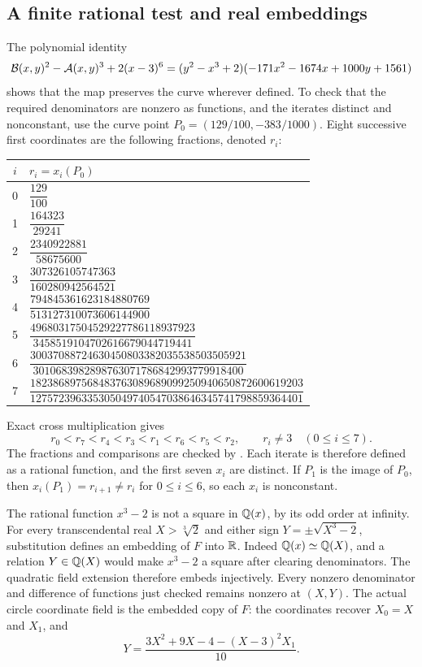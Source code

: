 \subsection{A finite rational test and real embeddings}
The polynomial identity
\begin{equation}\label{eq:curve-identity}
 \mathcal B(x,y)^2-\mathcal A(x,y)^3+2(x-3)^6
 =(y^2-x^3+2)(-171x^2-1674x+1000y+1561)
\end{equation}
shows that the map preserves the curve wherever defined. To check
that the required denominators are nonzero as functions, and the
iterates distinct and nonconstant, use the curve point
$P_0=(129/100,-383/1000)$. Eight successive first coordinates are
the following fractions, denoted $r_i$:
\begin{center}
\small
\begin{tabular}{@{}cl@{}}
\toprule
$i$&$r_i=x_i(P_0)$\\
\midrule
0&$\dfrac{129}{100}$\\[3pt]
1&$\dfrac{164323}{29241}$\\[3pt]
2&$\dfrac{2340922881}{58675600}$\\[3pt]
3&$\dfrac{307326105747363}{160280942564521}$\\[3pt]
4&$\dfrac{794845361623184880769}{513127310073606144900}$\\[3pt]
5&$\dfrac{49680317504529227786118937923}{3458519104702616679044719441}$\\[3pt]
6&$\dfrac{30037088724630450803382035538503505921}{3010683982898763071786842993779918400}$\\[3pt]
7&$\dfrac{182386897568483763089689099250940650872600619203}{127572396335305049740547038646345741798859364401}$\\[3pt]
\bottomrule
\end{tabular}
\end{center}
Exact cross multiplication gives
\begin{equation}\label{eq:orbit-order}
 r_0<r_7<r_4<r_3<r_1<r_6<r_5<r_2,
 \qquad r_i\ne3\quad(0\le i\le7).
\end{equation}
The fractions and comparisons are checked by
. Each iterate is therefore defined as a
rational function, and the first seven $x_i$ are distinct. If
$P_1$ is the image of $P_0$, then $x_i(P_1)=r_{i+1}\ne r_i$
for $0\le i\le6$, so each $x_i$ is nonconstant.

The rational function $x^3-2$ is not a square in $\mathbb Q(x)$, by its
odd order at infinity. For every transcendental real
$X>\sqrt[3]{2}$ and either sign $Y=\pm\sqrt{X^3-2}$, substitution
defines an embedding of $F$ into $\mathbb R$. Indeed $\mathbb Q(x)\simeq\mathbb Q(X)$,
and a relation $Y\in\mathbb Q(X)$ would make $x^3-2$ a square after
clearing denominators. The quadratic field extension therefore
embeds injectively. Every nonzero denominator and difference of
functions just checked remains nonzero at $(X,Y)$.
The actual circle coordinate field is the embedded copy of $F$:
the coordinates recover $X_0=X$ and $X_1$, and
\[
 Y=\frac{3X^2+9X-4-(X-3)^2X_1}{10}.
\]

